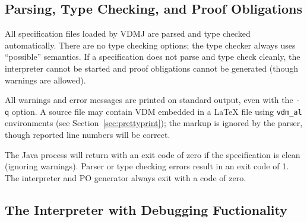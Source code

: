 \documentclass{overturerepsec}
\begin{document}



\subsection{Parsing, Type Checking, and Proof Obligations}

All specification files loaded by VDMJ are parsed and type checked
automatically. There are no type checking options; the type checker
always uses ``possible'' semantics. If a specification does not parse
and type check cleanly, the interpreter cannot be started and proof
obligations cannot be generated (though warnings are allowed).

All warnings and error messages are printed on standard output, even
with the \texttt{-q} option.  A source file may contain VDM embedded
in a LaTeX file using \verb|vdm_al| environments (see
Section~\ref{sec:prettyprint}); the markup is ignored by the parser,
though reported line numbers will be correct.

The Java process will return with an exit code of zero if the
specification is clean (ignoring warnings).  Parser or type checking
errors result in an exit code of 1. The interpreter and PO generator
always exit with a code of zero.

\subsection{The Interpreter with Debugging Fuctionality}
\end{document}
